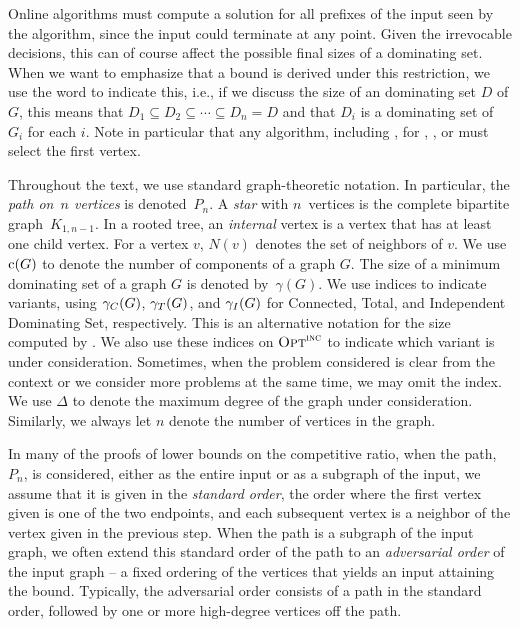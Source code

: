 Online algorithms must compute a solution for all prefixes of
the input seen by the algorithm, since the input could terminate at
any point. Given the irrevocable decisions,
this can of course affect the possible final sizes of a dominating
set. When we want to emphasize that a bound is derived under this
restriction, we use the word \emph{\incr} to indicate this,
i.e., if we discuss the size of an \incr dominating set $D$ of $G$,
this means that 
$D_1\subseteq D_2\subseteq \cdots \subseteq D_n=D$ and that 
$D_i$ is a dominating set of $G_i$ for each $i$.
Note in particular that any \incr algorithm, including \onopt, for
\ds, \cds, or \ids must select the first vertex.

Throughout the text, we use standard graph-theoretic notation.
In particular, the \emph{path on~$n$ vertices} is denoted~$P_n$.
A {\em star} with $n$~vertices is the complete bipartite graph~$K_{1,n-1}$.
In a rooted tree, an {\em internal} vertex is a vertex that has at
least one child vertex.
For a vertex $v$, $N(v)$ denotes the set of neighbors of $v$.
We  use $\mathrm{c}(G)$ to denote the number of components of a graph $G$.
The size of a minimum
dominating set of a graph $G$ is denoted by~$\gamma(G)$.
We use indices to
indicate variants, using $\gamma_C(G)$, $\gamma_T(G)$, and $\gamma_I(G)$
for Connected, Total, and Independent Dominating Set, respectively.
This is an alternative notation for the size computed by \offopt.
We also use these indices on $\operatorname{\textsc{Opt}}^\textsc{\ensuremath{\text{inc}}}$ to indicate which
variant is under consideration.
Sometimes, when the problem considered is clear from the context or
we consider more problems at the same time, we may omit the index.
We use $\Delta$ to denote the maximum degree of the graph under
consideration.
Similarly, we always let $n$ denote the number of vertices in the
graph.

In many of the proofs of lower bounds on the competitive ratio, 
when the path, $P_n$, is considered, either as the entire input
or as a subgraph of the input,
we assume that it is given in the \emph{standard order}, the order
where the first vertex given is one of the two endpoints, and each
subsequent vertex 
is a neighbor of the vertex given in the previous step.
When the path is a subgraph of the input graph, we often
extend this standard order of the path to
an \emph{adversarial order} of the input graph -- a fixed ordering of the 
vertices that yields an input attaining the bound.
Typically, the adversarial order consists of a path in the 
standard order, followed by one or more high-degree vertices
off the path.


